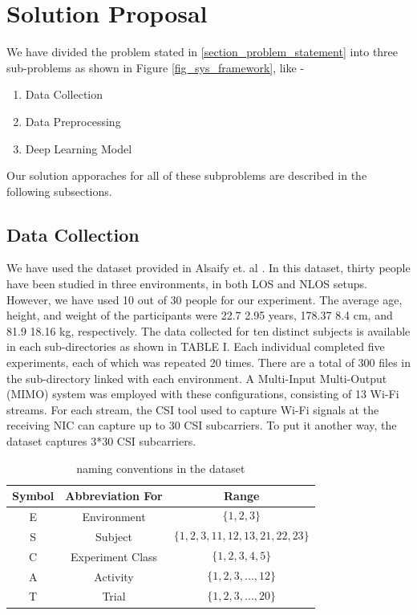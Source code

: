 \documentclass[conference]{IEEEtran}
\begin{document}
\section{Solution Proposal}
We have divided the problem stated in \ref{section_problem_statement} into three sub-problems as shown in Figure \ref{fig_sys_framework}, like -
\begin{enumerate}
\item Data Collection
\item Data Preprocessing
\item Deep Learning Model
\end{enumerate}
Our solution apporaches for all of these subproblems are described in the following subsections.

\subsection{Data Collection}
We have used the dataset provided in Alsaify et. al \cite{dataset}. In this dataset, thirty people have been studied in three environments, in both LOS and NLOS setups. However, we have used 10 out of 30 people for our experiment. The average age, height, and weight of the participants were 22.7 2.95 years, 178.37 8.4 cm, and 81.9 18.16 kg, respectively. The data collected for ten distinct subjects is available in each sub-directories as shown in TABLE I. Each individual completed five experiments, each of which was repeated 20 times. There are a total of 300 files in the sub-directory linked with each environment. A Multi-Input Multi-Output (MIMO) system was employed with these configurations, consisting of 13 Wi-Fi streams. For each stream, the CSI tool used to capture Wi-Fi signals at the receiving NIC can capture up to 30 CSI subcarriers. To put it another way, the dataset captures 3*30 CSI subcarriers.




\begin{table}
    \begin{tabular}{| c|c|c |} 
     \hline
     Symbol	& Abbreviation For & Range\\ [0.2ex]
     \hline
     E	& Environment &	\multicolumn{1}{|l|}{$$\{1, 2, 3\}$$}\\ [1ex] 
     S	& Subject	& \multicolumn{1}{|l|}{$$\{1, 2, 3, 11, 12, 13, 21, 22, 23\}$$}\\ [1ex] 
     C	& Experiment Class	& \multicolumn{1}{|l|}{$$\{1, 2, 3, 4, 5\}$$}\\ [1ex] 
     A	& Activity	& \multicolumn{1}{|l|}{$$\{1, 2, 3, ..., 12\}$$}\\ [1ex] 
     T	& Trial	& \multicolumn{1}{|l|}{$$\{1, 2, 3, ..., 20\}$$}\\ [1ex]
     \hline\hline
    \end{tabular}
\caption{\label{tab:table_naming} naming conventions in the dataset}
\end{table}
\end{document}
